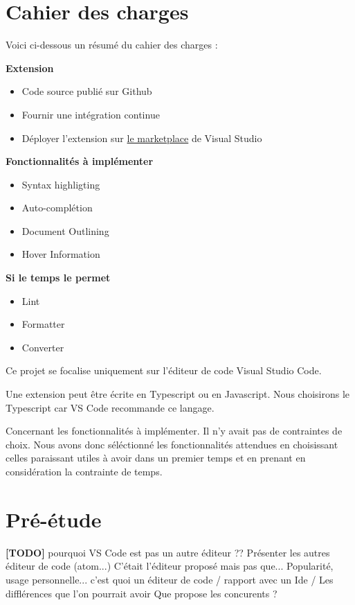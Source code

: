 \documentclass[
    iict, %
    il, %
]{heig-tb}
\begin{document}
\let\cleardoublepage\clearpage

\chapter{Cahier des charges}
Voici ci-dessous un résumé du cahier des charges :

\textbf{Extension}
\begin{itemize}
    \item Code source publié sur Github
    \item Fournir une intégration continue
    \item Déployer l'extension sur \href{https://marketplace.visualstudio.com/}{le marketplace} de Visual Studio
\end{itemize}

\textbf{Fonctionnalités à implémenter}
\begin{itemize}
    \item Syntax highligting
    \item Auto-complétion
    \item Document Outlining
    \item Hover Information
\end{itemize}

\textbf{Si le temps le permet}
\begin{itemize}
    \item Lint
    \item Formatter
    \item Converter
\end{itemize}

\vspace{\parskip}

Ce projet se focalise uniquement sur l'éditeur de code Visual Studio Code.

Une extension peut être écrite en Typescript ou en Javascript.
Nous choisirons le Typescript car VS Code recommande ce langage.

Concernant les fonctionnalités à implémenter. Il n'y avait pas de contraintes de choix.
Nous avons donc séléctionné les fonctionnalités attendues en choisissant celles paraissant utiles à avoir dans un premier temps et en prenant en considération la contrainte de temps.

\chapter{Pré-étude}

\textbf{[TODO]}
pourquoi VS Code est pas un autre éditeur ??
Présenter les autres éditeur de code (atom...)
C'était l'éditeur proposé mais pas que...
Popularité, usage personnelle...
c'est quoi un éditeur de code / rapport avec un Ide / Les difflérences que l'on pourrait avoir
Que propose les concurents ?
\end{document}
